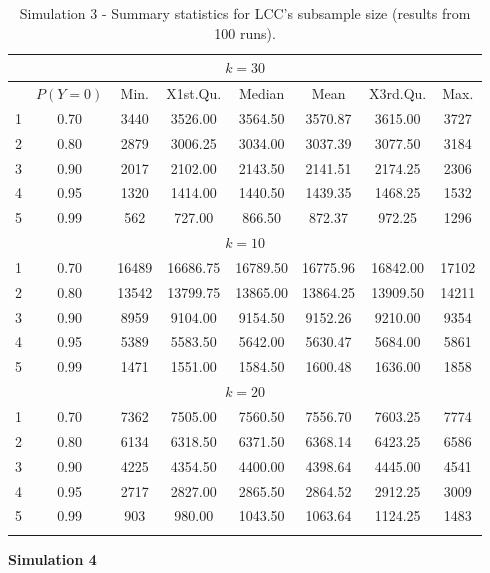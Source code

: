 \begin{longtable}{cccccccc}
  \hline
  \multicolumn{8}{c}{$k=30$} \\
  \hline
 & $P(Y=0)$ & Min. & X1st.Qu. & Median & Mean & X3rd.Qu. & Max. \\ 
  \hline
1 & 0.70 & 3440 & 3526.00 & 3564.50 & 3570.87 & 3615.00 & 3727 \\ 
  2 & 0.80 & 2879 & 3006.25 & 3034.00 & 3037.39 & 3077.50 & 3184 \\ 
  3 & 0.90 & 2017 & 2102.00 & 2143.50 & 2141.51 & 2174.25 & 2306 \\ 
  4 & 0.95 & 1320 & 1414.00 & 1440.50 & 1439.35 & 1468.25 & 1532 \\ 
  5 & 0.99 & 562 & 727.00 & 866.50 & 872.37 & 972.25 & 1296 \\ 
  \hline
  \multicolumn{8}{c}{$k=10$} \\
  \hline
    1 & 0.70 & 16489 & 16686.75 & 16789.50 & 16775.96 & 16842.00 & 17102 \\ 
  2 & 0.80 & 13542 & 13799.75 & 13865.00 & 13864.25 & 13909.50 & 14211 \\ 
  3 & 0.90 & 8959 & 9104.00 & 9154.50 & 9152.26 & 9210.00 & 9354 \\ 
  4 & 0.95 & 5389 & 5583.50 & 5642.00 & 5630.47 & 5684.00 & 5861 \\ 
  5 & 0.99 & 1471 & 1551.00 & 1584.50 & 1600.48 & 1636.00 & 1858 \\ 
   \hline
   \multicolumn{8}{c}{$k=20$} \\
   \hline
1 & 0.70 & 7362 & 7505.00 & 7560.50 & 7556.70 & 7603.25 & 7774 \\ 
  2 & 0.80 & 6134 & 6318.50 & 6371.50 & 6368.14 & 6423.25 & 6586 \\ 
  3 & 0.90 & 4225 & 4354.50 & 4400.00 & 4398.64 & 4445.00 & 4541 \\ 
  4 & 0.95 & 2717 & 2827.00 & 2865.50 & 2864.52 & 2912.25 & 3009 \\ 
  5 & 0.99 & 903 & 980.00 & 1043.50 & 1063.64 & 1124.25 & 1483 \\ 
   \hline
\caption[Simulation 3 - Summary statistics for LCC's subsample size.]{Simulation 3 - Summary statistics for LCC's subsample size (results from 100 runs).}
\label{tab:sim3-Ns}
\end{longtable}


\textbf{Simulation 4}



